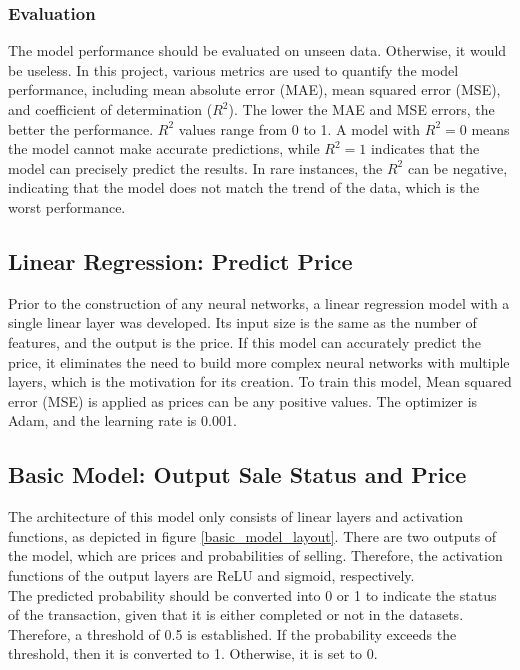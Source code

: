 \documentclass[12pt,twoside]{report}
\begin{document}
\subsubsection{Evaluation}
The model performance should be evaluated on unseen data. Otherwise, it would be useless. In this project, various metrics are used to quantify the model performance, including mean absolute error (MAE), mean squared error (MSE), and coefficient of determination ($R^2$).  The lower the MAE and MSE errors, the better the performance. $R^2$ values range from 0 to 1. A model with $R^2 = 0$ means the model cannot make accurate predictions, while $R^2 = 1$ indicates that the model can precisely predict the results. In rare instances, the $R^2$ can be negative, indicating that the model does not match the trend of the data, which is the worst performance. 

\subsection{Linear Regression: Predict Price}
\label{linear_regression_model_construction}
Prior to the construction of any neural networks, a linear regression model with a single linear layer was developed. Its input size is the same as the number of features, and the output is the price. If this model can accurately predict the price, it eliminates the need to build more complex neural networks with multiple layers, which is the motivation for its creation. To train this model, Mean squared error (MSE) is applied as prices can be any positive values. The optimizer is Adam, and the learning rate is 0.001.  

\subsection{Basic Model: Output Sale Status and Price}
\label{basic_model_price_status_construction}
The architecture of this model only consists of linear layers and activation functions, as depicted in figure \ref{basic_model_layout}. There are two outputs of the model, which are prices and probabilities of selling. Therefore, the activation functions of the output layers are ReLU and sigmoid, respectively.
\\

The predicted probability should be converted into 0 or 1 to indicate the status of the transaction, given that it is either completed or not in the datasets. Therefore, a threshold of 0.5 is established. If the probability exceeds the threshold, then it is converted to 1. Otherwise, it is set to 0.
\\
\end{document}
